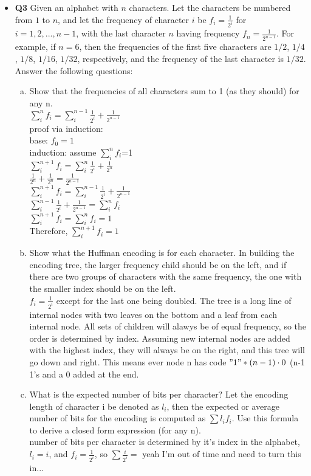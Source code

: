 \documentclass[11pt]{article}
\begin{document}
\begin{itemize}
\item \textbf{Q3} 
Given an alphabet with $n$ characters. Let the characters be numbered from $1$ to $n$, and let the frequency of character $i$ be $f_i=\frac{1}{2^i}$ for $i=1,2,...,n-1$, with the last character $n$ having frequency $f_n=\frac{1}{2^{n-1}}$. For example, if $n=6$, then the frequencies of the first five characters are $1/2$, $1/4$, $1/8$, $1/16$, $1/32$, respectively, and the frequency of the last character is $1/32$.
Answer the following questions:
\begin{enumerate}[(a)]
\item Show that the frequencies of all characters sum to 1 (as they should) for any n.
\\$\sum_i^{n} f_i=\sum_i^{n-1} \frac{1}{2^i} + \frac{1}{2^{n-1}}$
\\proof via induction:
\\base: $f_0=1$
\\induction: assume $\sum_i^n f_i$=1
\\$\sum_i^{n+1} f_i=\sum_i^{n} \frac{1}{2^i} + \frac{1}{2^{n}}$
\\$\frac{1}{2^n} + \frac{1}{2^n} = \frac{1}{2^{n-1}}$
\\$\sum_i^{n+1} f_i=\sum_i^{n-1} \frac{1}{2^i} + \frac{1}{2^{n-1}}$
\\$\sum_i^{n-1} \frac{1}{2^i} + \frac{1}{2^{n-1}}=\sum_i^{n} f_i$
\\$\sum_i^{n+1} f_i = \sum_i^{n} f_i = 1$
\\Therefore, $\sum_i^{n+1} f_i=1$
\item Show what the Huffman encoding is for each character. In building the encoding tree, the larger frequency child should be on the left, and if there are two groups of characters with the same frequency, the one with the smaller index should be on the left.
\\$f_i=\frac{1}{2^i}$ except for the last one being doubled. The tree is a long line of internal nodes with two leaves on the bottom and a leaf from each internal node. All sets of children will alawys be of equal frequency, so the order is determined by index. Assuming new internal nodes are added with the highest index, they will always be on the right, and this tree will go down and right. This means ever node n has code $"1"*(n-1) \cdot 0$ (n-1 1's and a 0 added at the end.
\item What is the expected number of bits per character? Let the encoding length of character i be denoted as $l_i$, then the expected or average number of bits for the encoding is computed as $\sum l_if_i$. Use this formula to derive a closed form expression (for any n).
\\number of bits per character is determined by it's index in the alphabet, $l_i=i$, and $f_i=\frac{1}{2^i}$, so $\sum\frac{i}{2^i}=$ yeah I'm out of time and need to turn this in... 
\end{enumerate}

\end{itemize}
\end{document}
